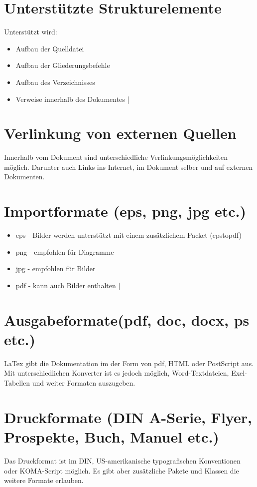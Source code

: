 \documentclass[12pt]{article}
\begin{document}
\section{Unterstützte Strukturelemente}
Unterstützt wird:
\begin{itemize}
	\item Aufbau der Quelldatei
	\item Aufbau der Gliederungsbefehle
	\item Aufbau des Verzeichnisses
	\item Verweise innerhalb des Dokumentes
|\end{itemize}

\section{Verlinkung von externen Quellen}
Innerhalb vom Dokument sind unterschiedliche Verlinkungsmöglichkeiten möglich.
Darunter auch Links ins Internet, im Dokument selber und auf externen Dokumenten.

\section{Importformate (eps, png, jpg etc.)}
\begin{itemize}
	\item eps - Bilder werden unterstützt mit einem zusätzlichem Packet (epstopdf)
	\item png - empfohlen für Diagramme
	\item jpg - empfohlen für Bilder
	\item pdf - kann auch Bilder enthalten
|\end{itemize}

\section{Ausgabeformate(pdf, doc, docx, ps etc.)}
LaTex gibt die Dokumentation im der Form von pdf, HTML oder PostScript aus.
Mit unterschiedlichen Konverter ist es jedoch möglich, Word-Textdateien, Exel-Tabellen und weiter Formaten auszugeben.

\section{Druckformate (DIN A-Serie, Flyer, Prospekte, Buch, Manuel etc.)}
Das Druckformat ist im DIN, US-amerikanische typografischen Konventionen oder KOMA-Script möglich.
Es gibt aber zusätzliche Pakete und Klassen die weitere Formate erlauben.
\end{document}
